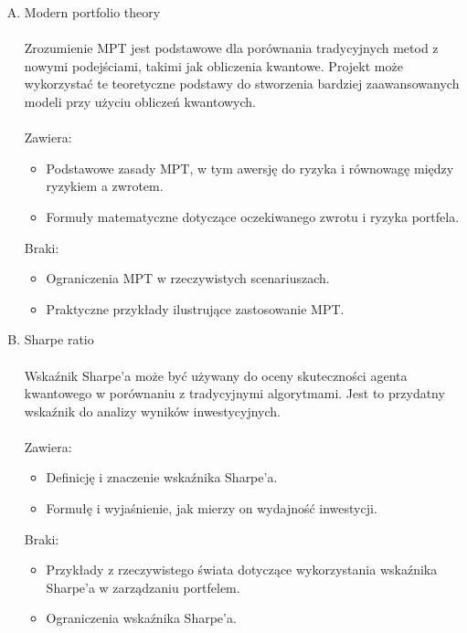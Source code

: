 \documentclass[polish,envcountsect,10pt]{article}
\begin{document}
\begin{enumerate}[I.]
\begin{enumerate}[A.]
\begin{itemize}
                \end{itemize}
          \item Modern portfolio theory
            \\
            \\
            Zrozumienie MPT jest podstawowe dla porównania tradycyjnych metod z nowymi podejściami, takimi jak obliczenia kwantowe. Projekt może wykorzystać te teoretyczne podstawy do stworzenia bardziej zaawansowanych modeli przy użyciu obliczeń kwantowych.
            \\
            \\
            Zawiera:
                \begin{itemize}
                  \item Podstawowe zasady MPT, w tym awersję do ryzyka i równowagę między ryzykiem a zwrotem.
                  \item Formuły matematyczne dotyczące oczekiwanego zwrotu i ryzyka portfela.
                \end{itemize}
            Braki:
                \begin{itemize}
                  \item Ograniczenia MPT w rzeczywistych scenariuszach.
                  \item Praktyczne przykłady ilustrujące zastosowanie MPT.
                \end{itemize}
          \item Sharpe ratio
            \\
            \\
            Wskaźnik Sharpe’a może być używany do oceny skuteczności agenta kwantowego w porównaniu z tradycyjnymi algorytmami. Jest to przydatny wskaźnik do analizy wyników inwestycyjnych.
            \\
            \\
            Zawiera:
                \begin{itemize}
                  \item Definicję i znaczenie wskaźnika Sharpe’a.
                  \item Formułę i wyjaśnienie, jak mierzy on wydajność inwestycji.
                \end{itemize}
            Braki:
                \begin{itemize}
                  \item Przykłady z rzeczywistego świata dotyczące wykorzystania wskaźnika Sharpe’a w zarządzaniu portfelem.
                  \item Ograniczenia wskaźnika Sharpe’a.

\end{itemize}
\end{enumerate}
\end{enumerate}
\end{document}
